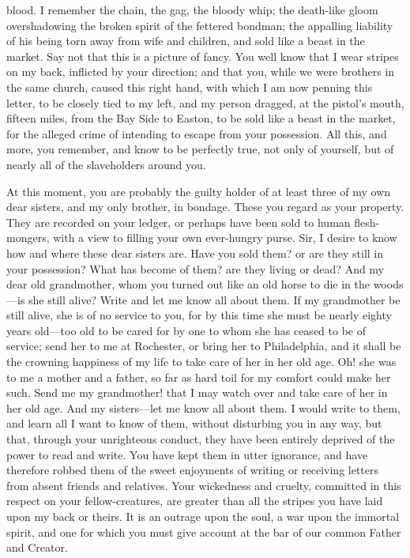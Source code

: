 blood. I remember the chain, the gag, the bloody whip; the death-like
gloom overshadowing the broken spirit of the fettered bondman; the
appalling liability of his being torn away from wife and children, and
sold like a beast in the market. Say not that this is a picture of
fancy. You well know that I wear stripes on my back, inflicted by your
direction; and that you, while we were brothers in the same church,
caused this right hand, with which I am now penning this letter, to be
closely tied to my left, and my person dragged, at the pistol's mouth,
fifteen miles, from the Bay Side to Easton, to be sold like a beast in
the market, for the alleged crime of intending to escape from your
possession. All this, and more, you remember, and know to be perfectly
true, not only of yourself, but of nearly all of the slaveholders around
you.

At this moment, you are probably the guilty holder of at least three of
my own dear sisters, and my only brother, in bondage. These you regard
as your property. They are recorded on your ledger, or perhaps have been
sold to human flesh-mongers, with a {}view to filling your own
ever-hungry purse. Sir, I desire to know how and where these dear
sisters are. Have you sold them? or are they still in your possession?
What has become of them? are they living or dead? And my dear old
grandmother, whom you turned out like an old horse to die in the
woods---is she still alive? Write and let me know all about them. If my
grandmother be still alive, she is of no service to you, for by this
time she must be nearly eighty years old---too old to be cared for by
one to whom she has ceased to be of service; send her to me at
Rochester, or bring her to Philadelphia, and it shall be the crowning
happiness of my life to take care of her in her old age. Oh! she was to
me a mother and a father, so far as hard toil for my comfort could make
her such. Send me my grandmother! that I may watch over and take care of
her in her old age. And my sisters---let me know all about them. I would
write to them, and learn all I want to know of them, without disturbing
you in any way, but that, through your unrighteous conduct, they have
been entirely deprived of the power to read and write. You have kept
them in utter ignorance, and have therefore robbed them of the sweet
enjoyments of writing or receiving letters from absent friends and
relatives. Your wickedness and cruelty, committed in this respect on
your fellow-creatures, are greater than all the stripes you have laid
upon my back or theirs. It is an outrage upon the soul, a war upon the
immortal spirit, and one for which you must give account at the bar of
our common Father and Creator.

